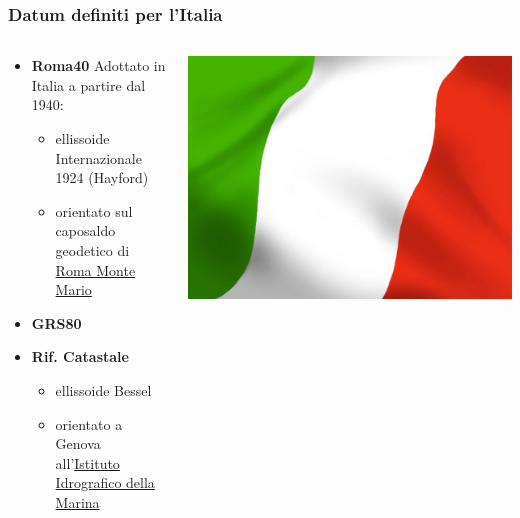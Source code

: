 \documentclass{beamer}
\begin{document}
{\begin{frame}
\end{frame}



\begin{frame}
   \frametitle{Datum definiti per l'Italia}
   \begin{columns}	
		\begin{column}{0.8\textwidth}
			
            \begin{itemize}
                \item \textbf{Roma40} Adottato in Italia a partire dal 1940:
                \begin{itemize}
                    \item ellissoide Internazionale 1924 (Hayford)
                    \item orientato sul caposaldo geodetico di \href{https://www.openstreetmap.org/search?whereami=1\&query=41.92441\%2C12.45212\#map=14/41.9246/12.4521}{Roma Monte Mario}
                \end{itemize}
                \item \textbf{GRS80}
                \item \textbf{Rif. Catastale}
                \begin{itemize}
                    \item ellissoide Bessel
                    \item orientato a Genova all'\href{https://www.openstreetmap.org/search?whereami=1\&query=44.4195\%2C8.9213\#map=16/44.4195/8.9213}{Istituto Idrografico della Marina}
                \end{itemize}
            \end{itemize}
            
            
		\end{column}
        \begin{column}{0.2\textwidth}
    		\includegraphics[width=1\textwidth] {./pics/ita.jpg}
		\end{column}	
	\end{columns}


\end{frame}}
\end{document}
